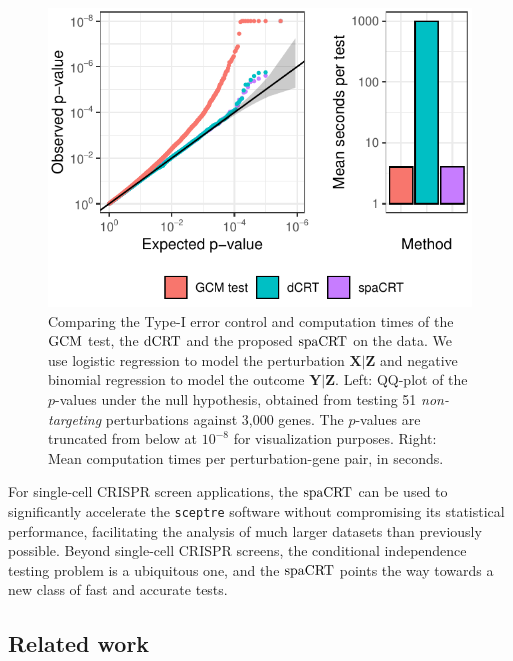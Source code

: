 \documentclass[12pt]{article}
\theoremstyle{definition}
\newcommand{\prx}{\bm X}								%
\newcommand{\prz}{\bm Z}								%
\newcommand{\pry}{{\bm Y}}								%
\newcommand{\dCRT}{\textnormal{dCRT}} 					%
\newcommand{\GCM}{\textnormal{GCM}}						%
\newcommand{\spacrt}{\textnormal{spaCRT}}               %
\begin{document}
\begin{figure}[h!]
	\centering
	\includegraphics{figures-and-tables/motivating_example.pdf} 
	\caption{Comparing the Type-I error control and computation times of the $\GCM$ test, the $\dCRT$ and the proposed $\spacrt$ on the \citet{Gasperini2019a} data. {\color{red} We use logistic regression to model the perturbation $\prx|\prz$ and negative binomial regression to model the outcome $\pry|\prz$.} Left: QQ-plot of the $p$-values under the null hypothesis, obtained from testing 51 \textit{non-targeting} perturbations against 3,000 genes. The $p$-values are truncated from below at $10^{-8}$ for visualization purposes. Right: Mean computation times per perturbation-gene pair, in seconds.}
	\label{fig:dCRT_GCM_binomial_poisson} 
\end{figure}

For single-cell CRISPR screen applications, the $\spacrt$ can be used to significantly accelerate the \verb|sceptre| software without compromising its statistical performance, facilitating the analysis of much larger datasets than previously possible. Beyond single-cell CRISPR screens, the conditional independence testing problem is a ubiquitous one, and the $\spacrt$ points the way towards a new class of fast and accurate tests.

\subsection{Related work}
\end{document}
